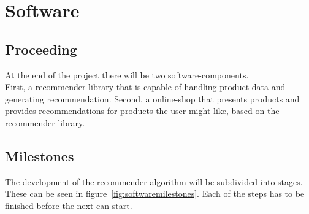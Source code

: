 
\section{Software}

\subsection{Proceeding}
At the end of the project there will be two software-components.\\
First, a recommender-library that is capable of handling product-data and generating recommendation.
Second, a online-shop that presents products and provides recommendations for products the user might like, based on the recommender-library.


\subsection{Milestones}
The development of the recommender algorithm will be subdivided into stages.
These can be seen in figure~\ref{fig:softwaremilestones}.
Each of the steps has to be finished before the next can start.\\

